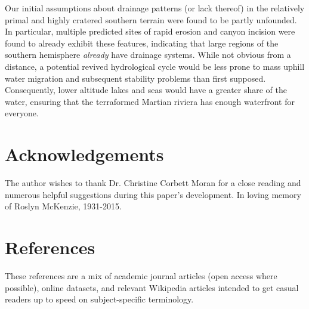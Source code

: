 \documentclass[12pt]{iopart}
\numberwithin{equation}{section}
\begin{document}
Our initial assumptions about drainage patterns (or lack thereof) in the relatively primal and highly cratered southern terrain were found to be partly unfounded. In particular, multiple predicted sites of rapid erosion and canyon incision were found to already exhibit these features, indicating that large regions of the southern hemisphere {\it already} have drainage systems. While not obvious from a distance, a potential revived hydrological cycle would be less prone to mass uphill water migration and subsequent stability problems than first supposed. Consequently, lower altitude lakes and seas would have a greater share of the water, ensuring that the terraformed Martian riviera has enough waterfront for everyone.

\section{Acknowledgements}
The author wishes to thank Dr. Christine Corbett Moran for a close reading and numerous helpful suggestions during this paper's development. In loving memory of Roslyn McKenzie, 1931-2015.

\section*{References}
These references are a mix of academic journal articles (open access where possible), online datasets, and relevant Wikipedia articles intended to get casual readers up to speed on subject-specific terminology.
\\
\end{document}
